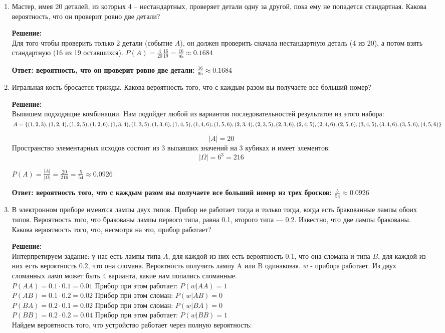 \documentclass[a4paper,12pt]{article}
\begin{document}
\begin{enumerate}
\item Мастер, имея 20 деталей, из которых 4 – нестандартных, проверяет детали одну за другой, пока ему не попадется стандартная. Какова вероятность, что он проверит ровно две детали? 

\textbf{Решение:}\\
Для того чтобы проверить только 2 детали (событие $A$), он должен проверить сначала нестандартную деталь (4 из 20), а потом взять стандартную (16 из 19 оставшихся). $P(A) =  \frac{4}{20} \frac{16}{19}=\frac{16}{95}\approx0.1684$ 

\textbf{Ответ: вероятность, что он проверит ровно две детали: $\frac{16}{95}\approx0.1684$}

\item Игральная кость бросается трижды. Какова вероятность того, что с каждым разом вы получаете все больший номер? 

\textbf{Решение:}\\
Выпишем подходящие комбинации.
Нам подойдет любой из вариантов последовательностей результатов из этого набора: \\
$A = \{(1,2,3), (1,2,4), (1,2,5), (1,2,6), (1,3,4), (1,3,5), (1,3,6), (1,4,5), (1,4,6), (1,5,6), \\(2,3,4), (2,3,5), (2,3,6), (2,4,5), (2,4,6), (2,5,6), (3,4,5), (3,4,6), (3,5,6), (4,5,6)\}$

$$|A| = 20$$
Пространство элементарных исходов состоит из 3 выпавших значений на 3 кубиках и имеет элементов:
$$|\Omega|=6^3=216$$

$P(A) = \frac{|A|}{|\Omega|}=\frac{20}{216}=\frac{5}{54}\approx0.0926$

\textbf{Ответ: вероятность того, что с каждым разом вы получаете все больший номер из трех бросков: $\frac{5}{54}\approx0.0926$}


\item В электронном приборе имеются лампы двух типов. Прибор не работает тогда и только тогда, когда есть бракованные лампы обоих типов. Вероятность того, что бракованы лампы первого типа, равна 0.1, второго типа — 0.2. Известно, что две лампы бракованы. Какова вероятность того, что, несмотря на это, прибор работает?


\textbf{Решение:}\\
Интерпретируем задание: у нас есть лампы типа $A$, для каждой из них есть вероятность $0.1$, что она сломана и типа $B$, для каждой из них есть вероятность $0.2$, что она сломана. Вероятность получить лампу A или B одинаковая. $w$ - прибора работает.
Из двух сломанных ламп может быть 4 варианта, какие нам попались сломанные.\\
$P(AA) = 0.1\cdot0.1 = 0.01$ Прибор при этом работает: $P(w|AA) = 1$\\
$P(AB) = 0.1\cdot0.2 = 0.02$ Прибор при этом сломан: $P(w|AB) = 0$\\
$P(BA) = 0.2\cdot0.1 = 0.02$ Прибор при этом сломан: $P(w|BA) = 0$\\
$P(BB) = 0.2\cdot0.2 = 0.04$ Прибор при этом работает: $P(w|BB) = 1$\\
Найдем вероятность того, что устройство работает через полную вероятность:


\end{enumerate}
\end{document}
